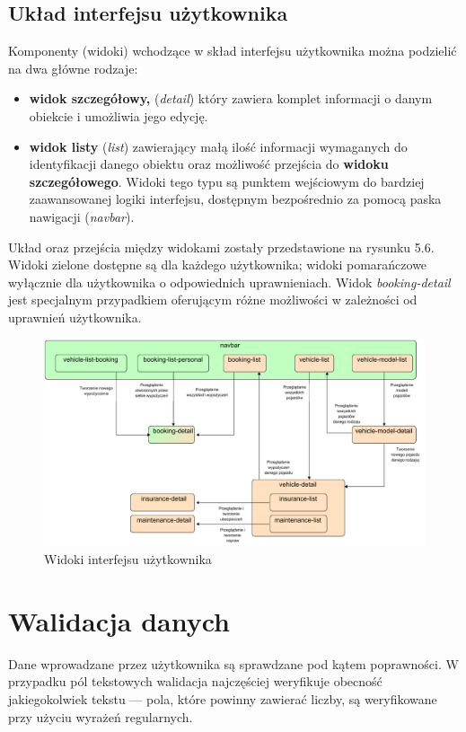 \documentclass[eng,printmode,openany]{mgr}
\begin{document}
	\subsection{Układ interfejsu użytkownika}
	Komponenty (widoki) wchodzące w skład interfejsu użytkownika można podzielić na dwa główne rodzaje:
	\begin{itemize}
		\item \textbf{widok szczegółowy,} (\textit{detail}) który zawiera komplet informacji o danym obiekcie i umożliwia jego edycję.
		\item \textbf{widok listy} (\textit{list}) zawierający małą ilość informacji wymaganych do identyfikacji danego obiektu oraz możliwość przejścia do \textbf{widoku szczegółowego}. Widoki tego typu są punktem wejściowym do bardziej zaawansowanej logiki interfejsu, dostępnym bezpośrednio za pomocą paska nawigacji (\textit{navbar}).
	\end{itemize}

	Układ oraz przejścia między widokami zostały przedstawione na rysunku 5.6. Widoki zielone dostępne są dla każdego użytkownika; widoki pomarańczowe wyłącznie dla użytkownika o odpowiednich uprawnieniach. Widok \textit{booking-detail} jest specjalnym przypadkiem oferującym różne możliwości w zależności od uprawnień użytkownika.
	
	\begin{figure}[H]
		\centering
		\includegraphics[width=\textwidth]{images/angular_views.png}
		\caption{Widoki interfejsu użytkownika}
	\end{figure}

	\section{Walidacja danych}
	Dane wprowadzane przez użytkownika są sprawdzane pod kątem poprawności. W przypadku pól tekstowych walidacja najczęściej weryfikuje obecność jakiegokolwiek tekstu — pola, które powinny zawierać liczby, są weryfikowane przy użyciu wyrażeń regularnych.
	
\end{document}
